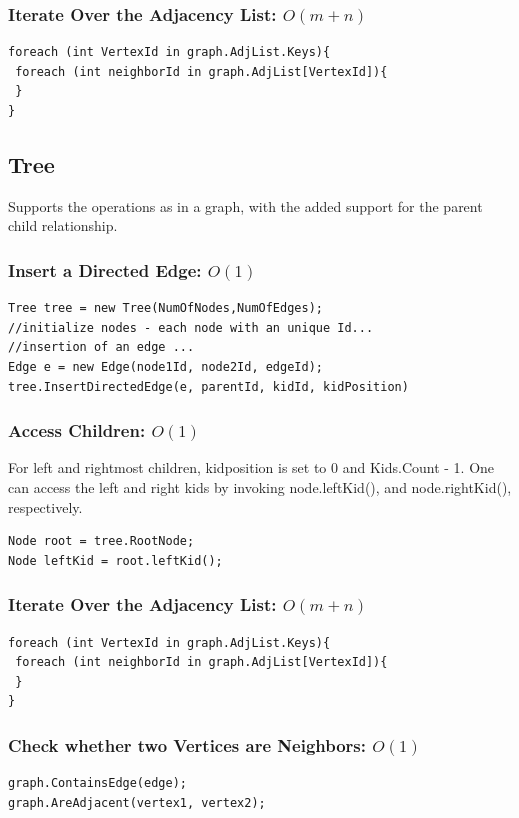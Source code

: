 \documentclass{article}
\begin{document}
\subsubsection{Iterate Over the Adjacency List: $O(m+n)$}
\begin{lstlisting}
foreach (int VertexId in graph.AdjList.Keys){
 foreach (int neighborId in graph.AdjList[VertexId]){
 }                
}
\end{lstlisting}


\subsection{Tree}
Supports the operations as in a graph, with the added support for the parent child relationship. 

\subsubsection{Insert a Directed Edge: $O(1)$} 
\begin{lstlisting}
Tree tree = new Tree(NumOfNodes,NumOfEdges);
//initialize nodes - each node with an unique Id...
//insertion of an edge ...
Edge e = new Edge(node1Id, node2Id, edgeId);
tree.InsertDirectedEdge(e, parentId, kidId, kidPosition)
\end{lstlisting}
\subsubsection{Access Children: $O(1)$}
For left and rightmost children, kidposition is set to 0 and  Kids.Count - 1. One can access the left and right kids by invoking node.leftKid(), and node.rightKid(), respectively.
\begin{lstlisting}
Node root = tree.RootNode;
Node leftKid = root.leftKid();
\end{lstlisting}

\subsubsection{Iterate Over the Adjacency List: $O(m+n)$}
\begin{lstlisting}
foreach (int VertexId in graph.AdjList.Keys){
 foreach (int neighborId in graph.AdjList[VertexId]){
 }                
}
\end{lstlisting}


\subsubsection{Check whether two Vertices are Neighbors: $O(1)$}
\begin{lstlisting}
graph.ContainsEdge(edge);
graph.AreAdjacent(vertex1, vertex2);
\end{lstlisting}
\end{document}
